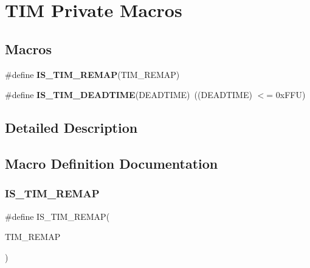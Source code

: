 \hypertarget{group___t_i_m_ex___private___macros}{}\section{T\+IM Private Macros}
\label{group___t_i_m_ex___private___macros}
\subsection*{Macros}
\begin{DoxyCompactItemize}
\item 
\#define {\bfseries I\+S\+\_\+\+T\+I\+M\+\_\+\+R\+E\+M\+AP}(T\+I\+M\+\_\+\+R\+E\+M\+AP)
\item 
\mbox{\label{group___t_i_m_ex___private___macros_gadba462318422eb55d14d477332be9274}} 
\#define {\bfseries I\+S\+\_\+\+T\+I\+M\+\_\+\+D\+E\+A\+D\+T\+I\+ME}(D\+E\+A\+D\+T\+I\+ME)~((D\+E\+A\+D\+T\+I\+ME) $<$= 0x\+F\+F\+U)
\end{DoxyCompactItemize}


\subsection{Detailed Description}


\subsection{Macro Definition Documentation}
\mbox{\label{group___t_i_m_ex___private___macros_ga7faab73212e996d8b49555d3ad5be965}} 
\subsubsection{\texorpdfstring{I\+S\+\_\+\+T\+I\+M\+\_\+\+R\+E\+M\+AP}{IS\_TIM\_REMAP}}
{\footnotesize\ttfamily \#define I\+S\+\_\+\+T\+I\+M\+\_\+\+R\+E\+M\+AP(\begin{DoxyParamCaption}\item[{}]{T\+I\+M\+\_\+\+R\+E\+M\+AP }\end{DoxyParamCaption})}

